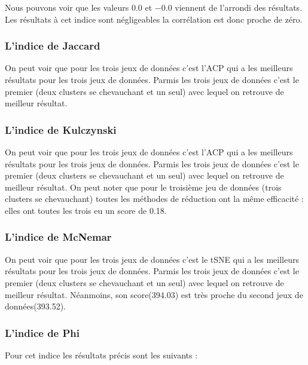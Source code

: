 Nous pouvons voir que les valeurs $0.0$ et $-0.0$ viennent de l'arrondi des résultats. Les résultats à cet indice sont négligeables la corrélation est donc proche de zéro.


\subsubsection{L'indice de Jaccard}
On peut voir que pour les trois jeux de données c'est l'ACP qui a les meilleurs résultats pour les trois jeux de données.
Parmis les trois jeux de données c'est le premier (deux clusters se chevauchant et un seul) avec lequel on retrouve de meilleur résultat.

\subsubsection{L'indice de Kulczynski}
On peut voir que pour les trois jeux de données c'est l'ACP qui a les meilleurs résultats pour les trois jeux de données.
Parmis les trois jeux de données c'est le premier (deux clusters se chevauchant et un seul) avec lequel on retrouve de meilleur résultat.
On peut noter que pour le troisième jeu de données (trois clusters se chevauchant) toutes les méthodes de réduction ont la même efficacité : 
elles ont toutes les trois eu un score de 0.18.


\subsubsection{L'indice de McNemar}
On peut voir que pour les trois jeux de données c'est le tSNE qui a les meilleurs résultats pour les trois jeux de données.
Parmis les trois jeux de données c'est le premier (deux clusters se chevauchant et un seul) avec lequel on retrouve de meilleur résultat.
Néanmoins, son score(394.03) est très proche du second jeux de données(393.52).

\subsubsection{L'indice de Phi}

Pour cet indice les résultats précis sont les suivants : 
\smallskip


